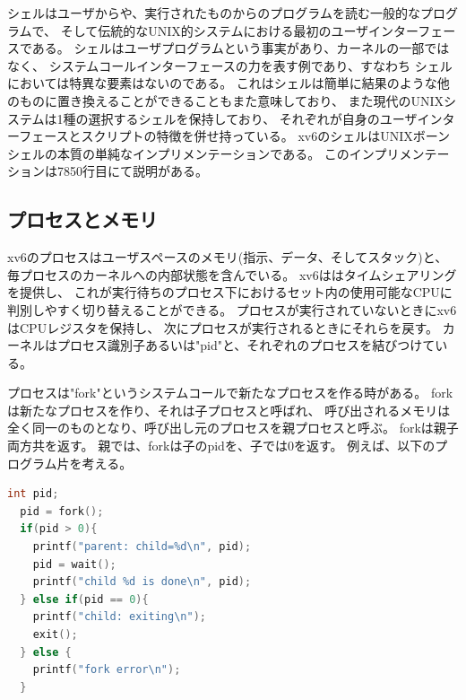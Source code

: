 \documentclass[11pt,a4paper, uplatex]{jsarticle}
\begin{document}
シェルはユーザからや、実行されたものからのプログラムを読む一般的なプログラムで、
そして伝統的なUNIX的システムにおける最初のユーザインターフェースである。
シェルはユーザプログラムという事実があり、カーネルの一部ではなく、
システムコールインターフェースの力を表す例であり、すなわち
シェルにおいては特異な要素はないのである。
これはシェルは簡単に結果のような他のものに置き換えることができることもまた意味しており、
また現代のUNIXシステムは1種の選択するシェルを保持しており、
それぞれが自身のユーザインターフェースとスクリプトの特徴を併せ持っている。
xv6のシェルはUNIXボーンシェルの本質の単純なインプリメンテーションである。
このインプリメンテーションは7850行目にて説明がある。

\subsection{プロセスとメモリ}
xv6のプロセスはユーザスペースのメモリ(指示、データ、そしてスタック)と、
毎プロセスのカーネルへの内部状態を含んでいる。
xv6ははタイムシェアリングを提供し、
これが実行待ちのプロセス下におけるセット内の使用可能なCPUに判別しやすく切り替えることができる。
プロセスが実行されていないときにxv6はCPUレジスタを保持し、
次にプロセスが実行されるときにそれらを戻す。
カーネルはプロセス識別子あるいは"pid"と、それぞれのプロセスを結びつけている。

プロセスは"fork"というシステムコールで新たなプロセスを作る時がある。
forkは新たなプロセスを作り、それは子プロセスと呼ばれ、
呼び出されるメモリは全く同一のものとなり、呼び出し元のプロセスを親プロセスと呼ぶ。
forkは親子両方共を返す。
親では、forkは子のpidを、子では0を返す。
例えば、以下のプログラム片を考える。
\begin{lstlisting}[language=c]
  int pid;
  pid = fork();
  if(pid > 0){
    printf("parent: child=%d\n", pid);
    pid = wait();
    printf("child %d is done\n", pid);
  } else if(pid == 0){
    printf("child: exiting\n");
    exit();
  } else {
    printf("fork error\n");
  }
\end{lstlisting}

%
%
\end{document}
